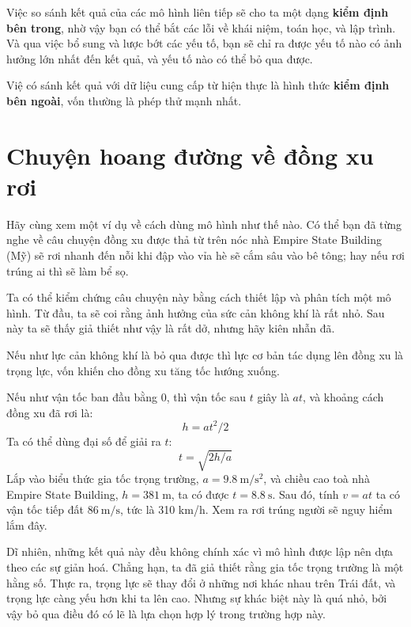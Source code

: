 \documentclass[12pt]{book}
\theoremstyle{exercise}
\begin{document}
Việc so sánh kết quả của các mô hình liên tiếp sẽ cho ta một dạng {\bf kiểm định bên trong}, nhờ vậy bạn có thể bắt các lỗi về khái niệm, toán học, và lập trình. Và qua việc bổ sung và lược bớt các yếu tố, bạn sẽ chỉ ra được yếu tố nào có ảnh hưởng lớn nhất đến kết quả, và yếu tố nào có thể bỏ qua được.


Việ có sánh kết quả với dữ liệu cung cấp từ hiện thực là hình thức {\bf kiểm định bên ngoài}, vốn thường là phép thử mạnh nhất.


\section{Chuyện hoang đường về đồng xu rơi}
\label{penny}

Hãy cùng xem một ví dụ về cách dùng mô hình như thế nào. Có thể bạn đã từng nghe về câu chuyện đồng xu được thả từ trên nóc nhà Empire State Building (Mỹ) sẽ rơi nhanh đến nỗi khi đập vào vỉa hè sẽ cắm sâu vào bê tông; hay nếu rơi trúng ai thì sẽ làm bể sọ.


Ta có thể kiểm chứng câu chuyện này bằng cách thiết lập và phân tích một mô hình. Từ đầu, ta sẽ coi rằng ảnh hưởng của sức cản không khí là rất nhỏ. Sau này ta sẽ thấy giả thiết như vậy là rất dở, nhưng hãy kiên nhẫn đã.

Nếu như lực cản không khí là bỏ qua được thì lực cơ bản tác dụng lên đồng xu là trọng lực, vốn khiến cho đồng xu tăng tốc hướng xuống. 

Nếu như vận tốc ban đầu bằng 0, thì vận tốc sau $t$ giây là $a t$, và khoảng cách đồng xu đã rơi là:
%
\[ h = a t^2 / 2 \]
%
Ta có thể dùng đại số để giải ra $t$:
%
\[ t = \sqrt{ 2 h / a} \]
%
Lắp vào biểu thức gia tốc trọng trường, $a = \SI{9.8}{\meter\per\second\squared}$, và chiều cao toà nhà Empire State Building, $h=\SI{381}{\meter}$, ta có được $t = \SI{8.8}{\second}$.  Sau đó, tính $v = a t$ ta có vận tốc tiếp đất $\SI{86}{\meter\per\second}$, tức là 310 km/h.  Xem ra rơi trúng người sẽ nguy hiểm lắm đây.

Dĩ nhiên, những kết quả này đều không chính xác vì mô hình được lập nên dựa theo các sự giản hoá. Chẳng hạn, ta đã giả thiết rằng gia tốc trọng trường là một hằng số. Thực ra, trọng lực sẽ thay đổi ở những nơi khác nhau trên Trái đất, và trọng lực càng yếu hơn khi ta lên cao. Nhưng sự khác biệt này là quá nhỏ, bởi vậy bỏ qua điều đó có lẽ là lựa chọn hợp lý trong trường hợp này.
\end{document}
